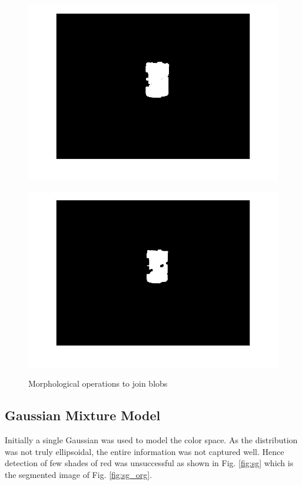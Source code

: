 \documentclass[fleqn,10pt]{SelfArx} %
\begin{document}
\begin{figure}[htb!]
\begin{minipage}[b]{.24\textwidth}
\end{minipage}
\begin{minipage}[b]{.24\textwidth}
\includegraphics[trim={3cm 2cm 3cm 2cm},clip,scale=0.19]{mp3.jpg}
\label{label-b}
\end{minipage}
\begin{minipage}[b]{.24\textwidth}
\includegraphics[trim={3cm 2cm 3cm 2cm},clip,scale=0.19]{mp4.jpg}
\label{label-b}
\end{minipage}
\caption{Morphological operations to join blobs}
\label{fig:morph}
\end{figure}

\subsection{Gaussian Mixture Model}
Initially a single Gaussian was used to model the color space. As the distribution was not truly ellipsoidal, the entire information was not captured well. Hence detection of few shades of red was unsuccessful as shown in Fig. \ref{fig:sg} which is the segmented image of Fig. \ref{fig:sg_org}. 
\end{document}

